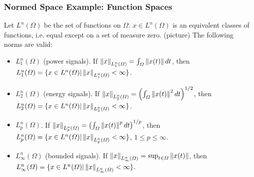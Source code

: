 \documentclass{beamer}
\begin{document}
\begin{frame}\frametitle{Normed Space Example: Function Spaces}
Let $L^n(\Omega)$ be the set of functions on $\Omega$. $x\in L^n(\Omega)$ is an equivalent classes of functions, i.e. equal except on a set of measure zero.  (picture)  The following norms are valid:
\begin{itemize}
\item 	$L_1^n(\Omega)$ (power signals).  If $\left\|x\right\|_{L_1^n(\Omega)} = \int_{\Omega}\left\| x(t)\right\|  dt$, then $L_1^n(\Omega) = \{ x\in L^n(\Omega)| \left\|x\right\|_{L_1^n(\Omega)} < \infty \}$.
\item $L_2^n(\Omega)$ (energy signals).  If $\left\|x\right\|_{L_2^n(\Omega)} = \left(\int_{\Omega}\left\| x(t)\right\|^2  dt\right)^{1/2}$, then $L_2^n(\Omega) = \{ x\in L^n(\Omega)| \left\|x\right\|_{L_2^n(\Omega)} < \infty \}$.
\item $L_p^n(\Omega)$.  If $\left\|x\right\|_{L_p^n(\Omega)} = \left(\int_{\Omega}\left\| x(t)\right\|^p  dt\right)^{1/p}$, then $L_p^n(\Omega) = \{ x\in L^n(\Omega)| \left\|x\right\|_{L_p^n(\Omega)} < \infty \}$, $1\leq p \leq \infty$.
\item 	$L_\infty^n(\Omega)$ (bounded signals).  If $\left\|x\right\|_{L_\infty^n(\Omega)} = \sup_{t\in\Omega}\left\| x(t)\right\|$, then $L_\infty^n(\Omega) = \{ x\in L^n(\Omega)| \left\|x\right\|_{L_\infty^n(\Omega)} < \infty \}$.
\end{itemize}
\end{frame}
\end{document}
